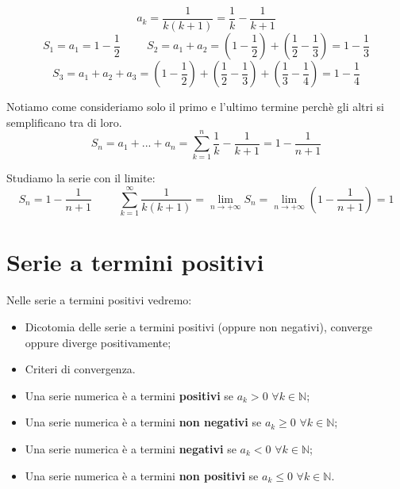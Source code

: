 \begin{example}
    \begin{equation*}a_k=\frac{1}{k(k+1)}=\frac{1}{k}-\frac{1}{k+1}\end{equation*}
    \begin{equation*}S_1=a_1=1-\frac{1}{2}\hspace{1cm}S_2=a_1+a_2=(1-\frac{1}{2})+(\frac{1}{2}-\frac{1}{3})=1-\frac{1}{3}\end{equation*}
    \begin{equation*}S_3=a_1+a_2+a_3=(1-\frac{1}{2})+(\frac{1}{2}-\frac{1}{3})+(\frac{1}{3}-\frac{1}{4})=1-\frac{1}{4}\end{equation*}
    
    Notiamo come consideriamo solo il primo e l'ultimo termine perchè gli altri si semplificano tra di loro.\\
    \begin{equation*}S_n=a_1+...+a_n=\sum^n_{k=1}\frac{1}{k}-\frac{1}{k+1}=1-\frac{1}{n+1}\end{equation*}
    
    Studiamo la serie con il limite:
    \begin{equation*}
        S_n=1-\frac{1}{n+1}\hspace{1cm}\sum^\infty_{k=1}\frac{1}{k(k+1)}=\lim_{n\to+\infty}S_n=\lim_{n\to+\infty}(1-\frac{1}{n+1})=1    
    \end{equation*}
\end{example}

\chapter{Serie a termini positivi}
Nelle serie a termini positivi vedremo:
\begin{itemize}
    \item Dicotomia delle serie a termini positivi (oppure non negativi), converge oppure diverge positivamente;
    \item Criteri di convergenza.
\end{itemize}

\begin{definition*}
    \phantom{a}
    \begin{itemize}
        \item[-] Una serie numerica è a termini \textbf{positivi} se $a_k>0$ $\forall k\in\mathbb{N}$;
        \item[-] Una serie numerica è a termini \textbf{non negativi} se $a_k\geq0$ $\forall k\in\mathbb{N}$;
        \item[-] Una serie numerica è a termini \textbf{negativi} se $a_k<0$ $\forall k\in\mathbb{N}$;
        \item[-] Una serie numerica è a termini \textbf{non positivi} se $a_k\leq0$ $\forall k\in\mathbb{N}$.
    \end{itemize}
\end{definition*}


